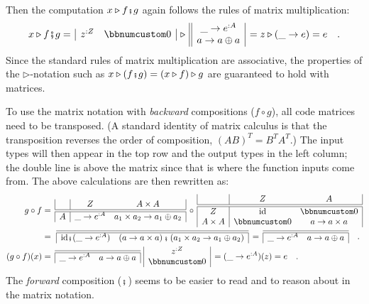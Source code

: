 Then the computation $x\triangleright f\bef g$ again follows the
rules of matrix multiplication:
\[
x\triangleright f\bef g=\,\begin{array}{|cc|}
z^{:Z} & \bbnum 0\end{array}\,\triangleright\,\begin{array}{||c|}
\_\rightarrow e^{:A}\\
a\rightarrow a\oplus a
\end{array}\,=z\triangleright(\_\rightarrow e)=e\quad.
\]
Since the standard rules of matrix multiplication are associative,
the properties of the $\triangleright$-notation such as $x\triangleright(f\bef g)=(x\triangleright f)\triangleright g$
are guaranteed to hold with matrices.

To use the matrix notation with \emph{backward} compositions ($f\circ g$),
all code matrices need to be transposed. (A standard identity of matrix
calculus is that the transposition reverses the order of composition,
$\left(AB\right)^{T}=B^{T}A^{T}$.) The input types will then appear
in the top row and the output types in the left column; the double
line is above the matrix since that is where the function inputs come
from. The above calculations are then rewritten as:
\begin{align*}
g\circ f & =\,\begin{array}{|c|cc|}
 & Z & A\times A\\
\hline\hline A & \_\rightarrow e^{:A} & a_{1}\times a_{2}\rightarrow a_{1}\oplus a_{2}
\end{array}\,\circ\,\begin{array}{|c|cc|}
 & Z & A\\
\hline\hline Z & \text{id} & \bbnum 0\\
A\times A & \bbnum 0 & a\rightarrow a\times a
\end{array}\\
 & =\,\,\begin{array}{|cc|}
\hline\hline \text{id}\bef(\_\rightarrow e^{:A}) & \left(a\rightarrow a\times a\right)\bef\left(a_{1}\times a_{2}\rightarrow a_{1}\oplus a_{2}\right)\end{array}\,=\,\begin{array}{|cc|}
\hline\hline \_\rightarrow e^{:A} & a\rightarrow a\oplus a\end{array}\quad.\\
(g\circ f)(x) & =\,\begin{array}{|cc|}
\hline\hline \_\rightarrow e^{:A} & a\rightarrow a\oplus a\end{array}\,\,\begin{array}{|c|}
z^{:Z}\\
\bbnum 0
\end{array}\,=(\_\rightarrow e^{:A})(z)=e\quad.
\end{align*}
The \emph{forward} composition ($\bef$) seems to be easier to read
and to reason about in the matrix notation.

